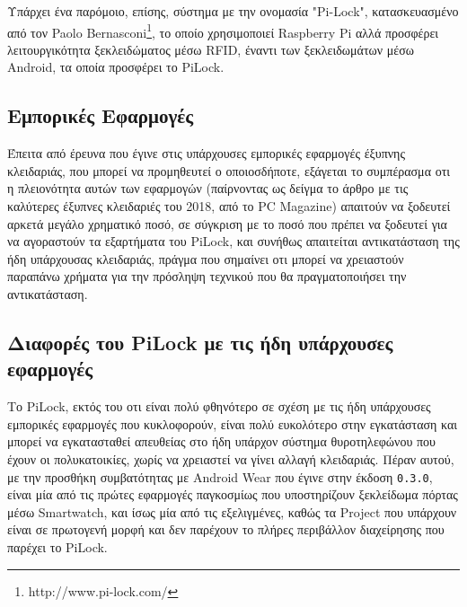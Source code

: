 		Υπάρχει ένα παρόμοιο, επίσης, σύστημα με την ονομασία "Pi-Lock", κατασκευασμένο από τον Paolo Bernasconi\footnote{http://www.pi-lock.com/}, το οποίο χρησιμοποιεί Raspberry Pi αλλά προσφέρει λειτουργικότητα ξεκλειδώματος μέσω RFID, έναντι των ξεκλειδωμάτων μέσω Android, τα οποία προσφέρει το PiLock.

	\subsection{Εμπορικές Εφαρμογές}
		Έπειτα από έρευνα που έγινε στις υπάρχουσες εμπορικές εφαρμογές έξυπνης κλειδαριάς, που μπορεί να προμηθευτεί ο οποιοσδήποτε, εξάγεται το συμπέρασμα οτι η πλειονότητα αυτών των εφαρμογών (παίρνοντας ως δείγμα το άρθρο με τις καλύτερες έξυπνες κλειδαριές του 2018, από το PC Magazine) απαιτούν να ξοδευτεί αρκετά μεγάλο χρηματικό ποσό, σε σύγκριση με το ποσό που πρέπει να ξοδευτεί για να αγοραστούν τα εξαρτήματα του PiLock, και συνήθως απαιτείται αντικατάσταση της ήδη υπάρχουσας κλειδαριάς, πράγμα που σημαίνει οτι μπορεί να χρειαστούν παραπάνω χρήματα για την πρόσληψη τεχνικού που θα πραγματοποιήσει την αντικατάσταση.

	\subsection{Διαφορές του PiLock με τις ήδη υπάρχουσες εφαρμογές}
		\label{pilock_innovation}
		Το PiLock, εκτός του οτι είναι πολύ φθηνότερο σε σχέση με τις ήδη υπάρχουσες εμπορικές εφαρμογές που κυκλοφορούν, είναι πολύ ευκολότερο στην εγκατάσταση και μπορεί να εγκατασταθεί απευθείας στο ήδη υπάρχον σύστημα θυροτηλεφώνου που έχουν οι πολυκατοικίες, χωρίς να χρειαστεί να γίνει αλλαγή κλειδαριάς. Πέραν αυτού, με την προσθήκη συμβατότητας με Android Wear που έγινε στην έκδοση \verb|0.3.0|, είναι μία από τις πρώτες εφαρμογές παγκοσμίως που υποστηρίζουν ξεκλείδωμα πόρτας μέσω Smartwatch, και ίσως μία από τις εξελιγμένες, καθώς τα Project που υπάρχουν είναι σε πρωτογενή μορφή και δεν παρέχουν το πλήρες περιβάλλον διαχείρησης που παρέχει το PiLock.